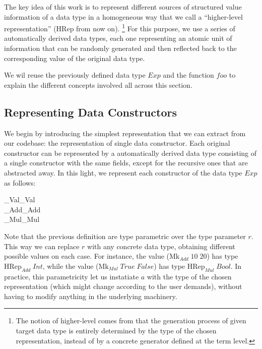\documentclass[conference, fleqn]{IEEEtran}
\newcommand{\Conid}[1]{\mathit{#1}}
\newcommand{\Varid}[1]{\mathit{#1}}
\def\resethooks{%
  \global\let\SaveRestoreHook\empty
  \global\let\ColumnHook\empty}
\let\hspre\empty
\let\hspost\empty
\begin{document}
The key idea of this work is to represent different sources of structured value
information of a data type in a homogeneous way that we call a ``higher-level
representation'' (\ensuremath{\text{HRep}} from now on).%
\footnote{The notion of higher-level comes from that the generation process of
  given target data type is entirely determined by the type of the chosen
  representation, instead of by a concrete generator defined at the term level.}
%
For this purpose, we use a series of automatically derived data types, each one
representing an atomic unit of information that can be randomly generated and
then reflected back to the corresponding value of the original data type.


We wil reuse the previously defined data type \ensuremath{\Conid{Exp}} and the function \ensuremath{\Varid{foo}} to
explain the different concepts involved all across this section.


\subsection{\textbf{Representing Data Constructors}}

We begin by introducing the simplest representation that we can extract from our
codebase: the representation of single data constructor.
%
Each original constructor can be represented by a automatically derived data
type consisting of a single constructor with the same fields, except for the
recursive ones that are abstracted away.
%
In this light, we represent each constructor of the data type \ensuremath{\Conid{Exp}} as follows:

\begin{hscode}\SaveRestoreHook
\column{B}{@{}>{\hspre}l<{\hspost}@{}}%
\column{16}{@{}>{\hspre}l<{\hspost}@{}}%
\column{E}{@{}>{\hspre}l<{\hspost}@{}}%
\>[B]{}\;_{Val}\;{}\<[16]%
\>[16]{}\Varid{r}\mathrel{=}_{Val}\;\Conid{Int}{}\<[E]%
\\
\>[B]{}\;_{Add}\;{}\<[16]%
\>[16]{}\Varid{r}\mathrel{=}_{Add}\;\Varid{r}\;\Varid{r}{}\<[E]%
\\
\>[B]{}\;_{Mul}\;{}\<[16]%
\>[16]{}\Varid{r}\mathrel{=}_{Mul}\;\Varid{r}\;\Varid{r}{}\<[E]%
\ColumnHook
\end{hscode}\resethooks

Note that the previous definition are type parametric over the type parameter
\ensuremath{\Varid{r}}.
%
This way we can replace \ensuremath{\Varid{r}} with any concrete data type, obtaining different
possible values on each case.
%
For instance, the value (\ensuremath{\text{Mk}_{Add}\;\mathrm{10}\;\mathrm{20}}) has type \ensuremath{\text{HRep}_{Add}\;\Conid{Int}}, while the
value (\ensuremath{\text{Mk}_{Mul}\;\Conid{True}\;\Conid{False}}) has type \ensuremath{\text{HRep}_{Mul}\;\Conid{Bool}}.
%
In practice, this parametricity let us instatiate \ensuremath{\Varid{a}} with the type of the
chosen representation (which might change according to the user demands),
without having to modify anything in the underlying machinery.
\end{document}
